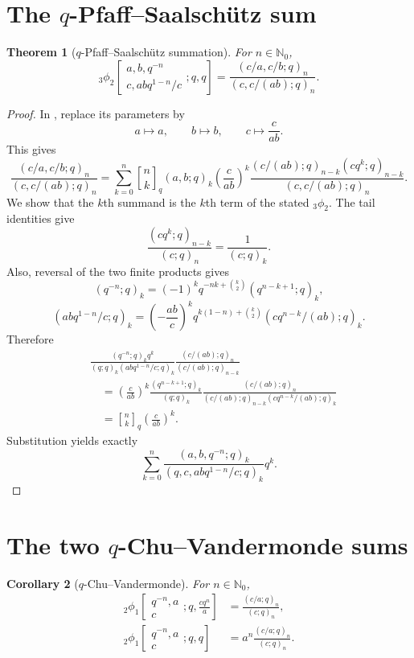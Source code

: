 \documentclass[11pt,oneside,openany]{book}
\newtheorem{theorem}{Theorem}[chapter]
\newtheorem{corollary}[theorem]{Corollary}
\theoremstyle{definition}
\theoremstyle{remark}
\newcommand{\qbinom}[2]{\genfrac{[}{]}{0pt}{}{#1}{#2}_{q}}
\newcommand{\N}{\mathbb N}
\begin{document}
\section{The \texorpdfstring{$q$}{q}-Pfaff--Saalsch\"utz sum}

\begin{theorem}[$q$-Pfaff--Saalsch\"utz summation]\label{thm:q-pfaff}
For $n\in\N_0$,
\[
 {}_3\phi_2\!\left[
 \begin{matrix}a,b,q^{-n}\\c,abq^{1-n}/c\end{matrix};q,q\right]
 =\frac{(c/a,c/b;q)_n}{(c,c/(ab);q)_n}.
\]
\end{theorem}

\begin{proof}
In , replace its parameters by
\[
 a\mapsto a,\qquad b\mapsto b,\qquad c\mapsto \frac{c}{ab}.
\]
This gives
\[
 \frac{(c/a,c/b;q)_n}{(c,c/(ab);q)_n}
 =\sum_{k=0}^{n}\qbinom nk(a,b;q)_k
 \left(\frac{c}{ab}\right)^k
 \frac{(c/(ab);q)_{n-k}(cq^k;q)_{n-k}}
 {(c,c/(ab);q)_n}.
\]
We show that the $k$th summand is the $k$th term of the stated ${}_3\phi_2$.  The tail identities give
\[
 \frac{(cq^k;q)_{n-k}}{(c;q)_n}=\frac1{(c;q)_k}.
\]
Also, reversal of the two finite products gives
\[
 (q^{-n};q)_k
 =(-1)^kq^{-nk+\binom k2}(q^{n-k+1};q)_k,
\]
\[
 (abq^{1-n}/c;q)_k
 =\left(-\frac{ab}{c}\right)^k
 q^{k(1-n)+\binom k2}
 (cq^{n-k}/(ab);q)_k.
\]
Therefore
\begin{align*}
 &\frac{(q^{-n};q)_k q^k}{(q;q)_k(abq^{1-n}/c;q)_k}
 \frac{(c/(ab);q)_n}{(c/(ab);q)_{n-k}}\\
 &\quad=\left(\frac{c}{ab}\right)^k
 \frac{(q^{n-k+1};q)_k}{(q;q)_k}
 \frac{(c/(ab);q)_n}
 {(c/(ab);q)_{n-k}(cq^{n-k}/(ab);q)_k}\\
 &\quad=\qbinom nk\left(\frac{c}{ab}\right)^k.
\end{align*}
Substitution yields exactly
\[
 \sum_{k=0}^{n}
 \frac{(a,b,q^{-n};q)_k}{(q,c,abq^{1-n}/c;q)_k}q^k.
\]
\end{proof}

\section{The two \texorpdfstring{$q$}{q}-Chu--Vandermonde sums}

\begin{corollary}[$q$-Chu--Vandermonde]\label{cor:q-chu}
For $n\in\N_0$,
\begin{align}
 {}_2\phi_1\!\left[
 \begin{matrix}q^{-n},a\\c\end{matrix};q,\frac{cq^n}{a}\right]
 &=\frac{(c/a;q)_n}{(c;q)_n},\label{eq:qchu1}\\
 {}_2\phi_1\!\left[
 \begin{matrix}q^{-n},a\\c\end{matrix};q,q\right]
 &=a^n\frac{(c/a;q)_n}{(c;q)_n}.
 \label{eq:qchu2}
\end{align}
\end{corollary}
\end{document}
